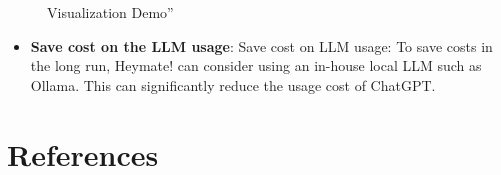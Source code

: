\documentclass[
  11pt,
  a4paper,
  DIV=11,
  numbers=noendperiod]{scrartcl}
\providecommand{\tightlist}{%
  \setlength{\itemsep}{0pt}\setlength{\parskip}{0pt}}\usepackage{longtable,booktabs,array}
\begin{document}
\begin{figure}

\caption{\label{fig-viz-demo}Visualization Demo''}


\end{figure}%

\begin{itemize}
\tightlist
\item
  \textbf{Save cost on the LLM usage}: Save cost on LLM usage: To save
  costs in the long run, Heymate! can consider using an in-house local
  LLM such as Ollama. This can significantly reduce the usage cost of
  ChatGPT.
\end{itemize}

\newpage{}

\section*{References}\label{references}
\end{document}

